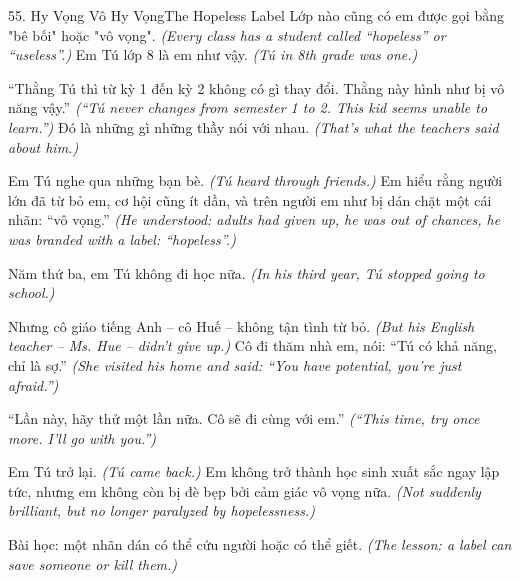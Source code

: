 \begin{truyen}{55. Hy Vọng Vô Hy Vọng}{The Hopeless Label}
Lớp nào cũng có em được gọi bằng "bê bối" hoặc "vô vọng".
\textit{(Every class has a student called ``hopeless'' or ``useless''.)}
Em Tú lớp 8 là em như vậy.
\textit{(Tú in 8th grade was one.)}

``Thằng Tú thì từ kỳ 1 đến kỳ 2 không có gì thay đổi. Thằng này hình như bị vô năng vậy.''
\textit{(``Tú never changes from semester 1 to 2. This kid seems unable to learn.'')}
Đó là những gì những thầy nói với nhau.
\textit{(That's what the teachers said about him.)}

Em Tú nghe qua những bạn bè.
\textit{(Tú heard through friends.)}
Em hiểu rằng người lớn đã từ bỏ em, cơ hội cũng ít dần, và trên người em như bị dán chặt một cái nhãn: ``vô vọng.''
\textit{(He understood: adults had given up, he was out of chances, he was branded with a label: ``hopeless''.)}

Năm thứ ba, em Tú không đi học nữa.
\textit{(In his third year, Tú stopped going to school.)}

Nhưng cô giáo tiếng Anh -- cô Huế -- không tận tình từ bỏ.
\textit{(But his English teacher -- Ms. Hue -- didn't give up.)}
Cô đi thăm nhà em, nói: ``Tú có khả năng, chỉ là sợ.''
\textit{(She visited his home and said: ``You have potential, you're just afraid.'')}

``Lần này, hãy thử một lần nữa. Cô sẽ đi cùng với em.''
\textit{(``This time, try once more. I'll go with you.'')}

Em Tú trở lại.
\textit{(Tú came back.)}
Em không trở thành học sinh xuất sắc ngay lập tức, nhưng em không còn bị đè bẹp bởi cảm giác vô vọng nữa.
\textit{(Not suddenly brilliant, but no longer paralyzed by hopelessness.)}

Bài học: một nhãn dán có thể cứu người hoặc có thể giết.
\textit{(The lesson: a label can save someone or kill them.)}
\end{truyen}

